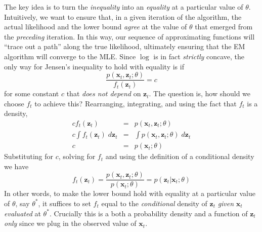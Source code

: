 \documentclass[12pt]{article}
\theoremstyle{definition}
\begin{document}
The key idea is to turn the \emph{inequality} into an \emph{equality} at a particular value of $\theta$. Intuitively, we want to ensure that, in a given iteration of the algorithm, the  actual likelihood and the lower bound \emph{agree} at the value of $\theta$ that emerged from the \emph{preceding} iteration. In this way, our sequence of approximating functions will ``trace out a path'' along the true likelihood, ultimately ensuring that the EM algorithm will converge to the MLE. Since $\log$ is in fact \emph{strictly} concave, the only way for Jensen's inequality to hold with equality is if 
$$\frac{p(\textbf{x}_t,\textbf{z}_t;\theta)}{f_t(\mathbf{z}_t)} = c$$
for some constant $c$ that \emph{does not depend} on $\mathbf{z}_t$. The question is, how should we choose $f_t$ to achieve this? Rearranging, integrating, and using the fact that $f_t$ is a density,
	\begin{eqnarray*}
		c f_t(\mathbf{z}_t) &=& p(\mathbf{x}_t, \mathbf{z}_t;\theta)\\
		c \int f_t(\mathbf{z}_t) \; d \mathbf{z}_t &=& \int p(\mathbf{x}_t, \mathbf{z}_t;\theta) \; d \mathbf{z}_t\\
		c &=& p(\mathbf{x}_t;\theta) 
	\end{eqnarray*}
Substituting for $c$, solving for $f_t$ and using the definition of a conditional density we have
	$$f_t(\textbf{z}_t)= \frac{p(\textbf{x}_t,\textbf{z}_t;\theta)}{p(\mathbf{x}_t;\theta)} = p(\textbf{z}_t|\textbf{x}_t;\theta)$$
In other words, to make the lower bound hold with equality at a particular value of $\theta$, say $\theta^*$, it suffices to set $f_t$ equal to the \emph{conditional} density of $\mathbf{z}_t$ \emph{given} $\mathbf{x}_t$ \emph{evaluated} at $\theta^*$. Crucially this is a both a probability density and a function of $\mathbf{z}_t$ \emph{only} since we plug in the observed value of $\mathbf{x}_t$.
\end{document}
